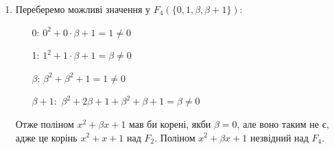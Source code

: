 \documentclass[a4paper,12pt]{article}
\begin{document}
\begin{justify}
\begin{enumerate}
 		\item Переберемо можливі значення у $F_4(\{0,1,\beta,\beta+1\}):$
 			\begin{itemize}
 				\item [0:] $0^2+0\cdot\beta+1=1\neq0$
 				\item [1:] $1^2+1\cdot\beta+1=\beta\neq0$
 				\item [$\beta$:] $\beta^2+\beta^2+1=1\neq0$
 				\item [$\beta+1:$] $\beta^2+2\beta+1+\beta^2+\beta+1=\beta\neq0$
 			\end{itemize} Отже поліном $x^2+\beta x+1$ мав би корені, якби $\beta=0$, але воно таким не є, адже це корінь $x^2+x+1$ над $F_2$. Поліном $x^2+\beta x+1$ незвідний над $F_4$.
 	\end{enumerate}
 	\end{justify}
\end{document}
